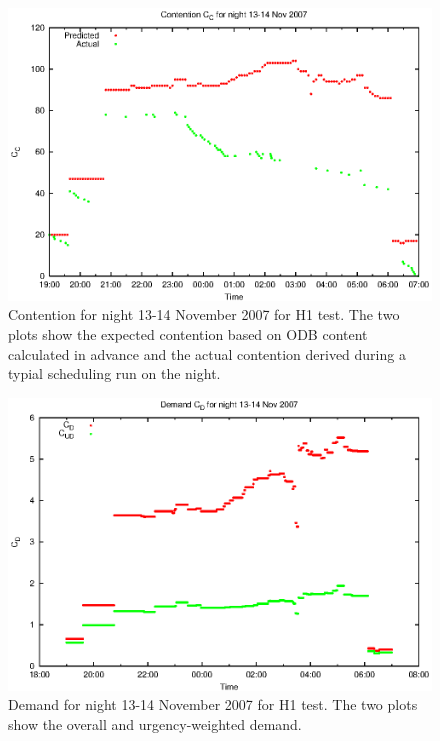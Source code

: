 \begin{figure}[htbp]
\begin{center}
    \includegraphics[scale=1.0, angle=0]{figures/mam/cont.eps}
\end{center}
\caption[Contention for night 13-14 November 2007.]
{Contention for night 13-14 November 2007 for H1 test. The two plots show the expected contention based on ODB content calculated in advance and the actual contention derived during a typial scheduling run on the night.}
\label{fig:mam_h1_contention}
\end{figure}

\begin{figure}[htbp]
\begin{center}
    \includegraphics[scale=1.0, angle=0]{figures/mam/dmd.eps}
\end{center}
\caption[Demand for night 13-14 November 2007.]
{Demand for night 13-14 November 2007 for H1 test. The two plots show the overall and urgency-weighted demand.}
\label{fig:mam_h1_dmd}
\end{figure}

